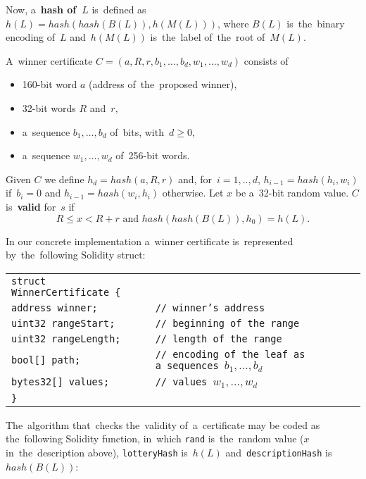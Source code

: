 \documentclass[a4paper]{article}
\newcommand{\lotteryhash}[1]{h({#1})}
\begin{document}
    Now, a~\textbf{hash of~$L$} is~defined as $h(L) = hash(hash(B(L)), h(M(L)))$, where $B(L)$ is~the~binary encoding of~$L$
    and~$h(M(L))$ is~the~label of~the~root of~$M(L)$.

    A~winner certificate $C = (a, R, r, b_1, \ldots, b_d, w_1, \ldots, w_d)$ consists of
    \begin{itemize}
        \item 160-bit word $a$ (address of~the~proposed winner),
        \item 32-bit words $R$ and~$r$,
        \item a~sequence $b_1, \ldots, b_d$ of~bits, with~$d \geq 0$,
        \item a~sequence $w_1, \ldots, w_d$ of~256-bit words.
    \end{itemize}

    Given $C$ we define $h_d = hash(a, R, r)$ and, for~$i = 1, .., d$, $h_{i-1} = hash(h_i, w_i)$ if~$b_i = 0$ and
    $h_{i-1} = hash(w_i, h_i)$ otherwise.
    Let $x$ be a~32-bit random value. $C$ is~\textbf{valid} for~$s$ if
    \begin{displaymath}
        R \leq x < R + r  \text{ and~} hash(hash(B(L)), h_0) = h(L).
    \end{displaymath}

    In our concrete implementation a~winner certificate is~represented by~the~following Solidity struct:

    \begin{center}
        \begin{tabular}{ll}
            \texttt{struct WinnerCertificate \{} &  \\
		    \qquad \texttt{address winner;} &  \texttt{// winner's address}\\
		    \qquad \texttt{uint32 rangeStart;} & \texttt{// beginning of~the~range}\\
		    \qquad \texttt{uint32 rangeLength;} & \texttt{// length of~the~range}\\
		    \qquad \texttt{bool[] path;} & \texttt{// encoding of~the~leaf as a~sequences $b_1, \ldots, b_d$}\\
		    \qquad \texttt{bytes32[] values;} & \texttt{// values $w_1, \ldots, w_d$}\\
    		\texttt{\}}
        \end{tabular}
    \end{center}

    The~algorithm that~checks the~validity of~a~certificate may be coded as the~following Solidity function,
    in~which \texttt{rand} is~the~random value ($x$ in~the~description above), \texttt{lotteryHash} is~$\lotteryhash{L}$
    and~\texttt{descriptionHash} is~$hash(B(L))$:
\end{document}
